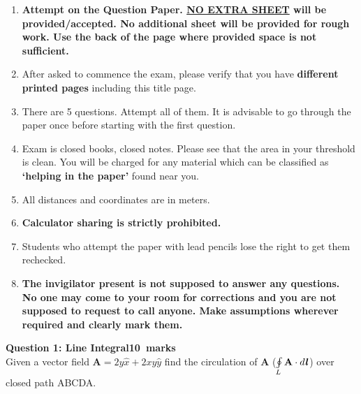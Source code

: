 \documentclass[12pt,a4paper]{article}
\def\QOne{10}
\begin{document}
\begin{enumerate}
\item \textbf{Attempt on the Question Paper. \underline{NO EXTRA SHEET} will be provided/accepted. No
additional sheet will be provided for rough work. Use the back of the page where
provided space is not sufficient.}
\item After asked to commence the exam, please verify that you have \textbf{\pageref{LastPage} different
printed pages} including this title page.
\item There are 5 questions. Attempt all of them. It is advisable to go through the paper once
before starting with the first question.
\item Exam is closed books, closed notes. Please see that the area in your threshold is clean.
You will be charged for any material which can be classified as \textbf{`helping in the paper'}
found near you.
\item All distances and coordinates are in meters.
\item \textbf{Calculator sharing is strictly prohibited.}
\item Students who attempt the paper with lead pencils lose the right to get them rechecked.
\item \textbf{The invigilator present is not supposed to answer any questions. No one may come
to your room for corrections and you are not supposed to request to call anyone.
Make assumptions wherever required and clearly mark them.}
\end{enumerate}
\newpage
\noindent\textbf{Question 1: Line Integral\hfill \QOne~marks}\\
Given a vector field $\textbf{A}=2y\hat x+2xy\hat y$ find the circulation of \textbf{A} ($\oint\limits_{L} \textbf{A}\cdot d\textbf{\textit{l}}$) over closed path ABCDA.
\end{document}
